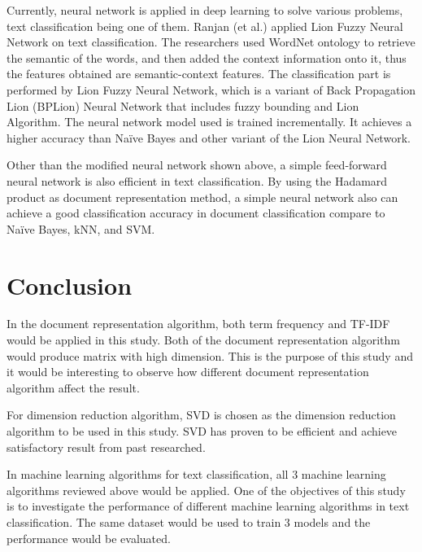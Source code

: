 Currently, neural network is applied in deep learning to solve various problems, text classification being one of them. Ranjan (et al.) applied Lion Fuzzy Neural Network on text classification. The researchers used WordNet ontology to retrieve the semantic of the words, and then added the context information onto it, thus the features obtained are semantic-context features. The classification part is performed by Lion Fuzzy Neural Network, which is a variant of Back Propagation Lion (BPLion) Neural Network that includes fuzzy bounding and Lion Algorithm. The neural network model used is trained incrementally. It achieves a higher accuracy than Naïve Bayes and other variant of the Lion Neural Network. \cite{lionNn}
	
Other than the modified neural network shown above, a simple feed-forward neural network is also efficient in text classification. By using the Hadamard product as document representation method, a simple neural network also can achieve a good classification accuracy in document classification compare to Naïve Bayes, kNN, and SVM. \cite{oneNn}\\
	
\clearpage
\section{Conclusion}
In the document representation algorithm, both term frequency and TF-IDF would be applied in this study. Both of the document representation algorithm would produce matrix with high dimension. This is the purpose of this study and it would be interesting to observe how different document representation algorithm affect the result.

For dimension reduction algorithm, SVD is chosen as the dimension reduction algorithm to be used in this study. SVD has proven to be efficient and achieve satisfactory result from past researched.
	
In machine learning algorithms for text classification, all 3 machine learning algorithms reviewed above would be applied. One of the objectives of this study is to investigate the performance of different machine learning algorithms in text classification. The same dataset would be used to train 3 models and the performance would be evaluated.
